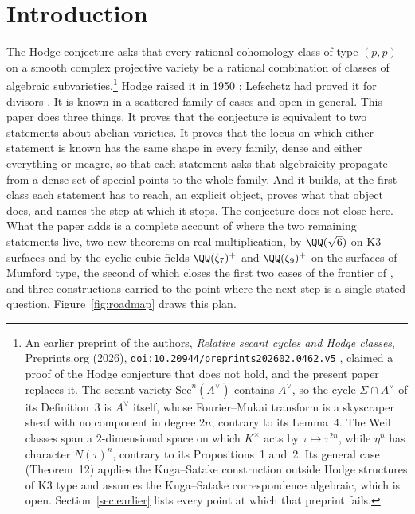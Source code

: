 \section{Introduction}\label{sec:intro}

The Hodge conjecture asks that every rational cohomology class of type $(p,p)$ on a smooth complex projective variety be a rational combination of classes of algebraic subvarieties.\footnote{An earlier preprint of the authors, \emph{Relative secant cycles and Hodge classes}, Preprints.org (2026), \nolinkurl{doi:10.20944/preprints202602.0462.v5} \cite{BB26}, claimed a proof of the Hodge conjecture that does not hold, and the present paper replaces it. The secant variety $\mathrm{Sec}^{n}(A^{\vee})$ contains $A^{\vee}$, so the cycle $\Sigma\cap A^{\vee}$ of its Definition~3 is $A^{\vee}$ itself, whose Fourier--Mukai transform is a skyscraper sheaf with no component in degree $2n$, contrary to its Lemma~4. The Weil classes span a $2$-dimensional space on which $K^{\times}$ acts by $\tau\mapsto\tau^{2n}$, while $\eta^{n}$ has character $N(\tau)^{n}$, contrary to its Propositions~1 and~2. Its general case (Theorem~12) applies the Kuga--Satake construction outside Hodge structures of K3 type and assumes the Kuga--Satake correspondence algebraic, which is open. Section~\ref{sec:earlier} lists every point at which that preprint fails.} Hodge raised it in 1950 \cite{Hod50}; Lefschetz had proved it for divisors \cite{Lef24}. It is known in a scattered family of cases and open in general. This paper does three things. It proves that the conjecture is equivalent to two statements about abelian varieties. It proves that the locus on which either statement is known has the same shape in every family, dense and either everything or meagre, so that each statement asks that algebraicity propagate from a dense set of special points to the whole family. And it builds, at the first class each statement has to reach, an explicit object, proves what that object does, and names the step at which it stops. The conjecture does not close here. What the paper adds is a complete account of where the two remaining statements live, two new theorems on real multiplication, by $\QQ(\sqrt6)$ on K3 surfaces and by the cyclic cubic fields $\QQ(\zeta_{7})^{+}$ and $\QQ(\zeta_{9})^{+}$ on the surfaces of Mumford type, the second of which closes the first two cases of the frontier of \cite{BMB26}, and three constructions carried to the point where the next step is a single stated question. Figure~\ref{fig:roadmap} draws this plan.

